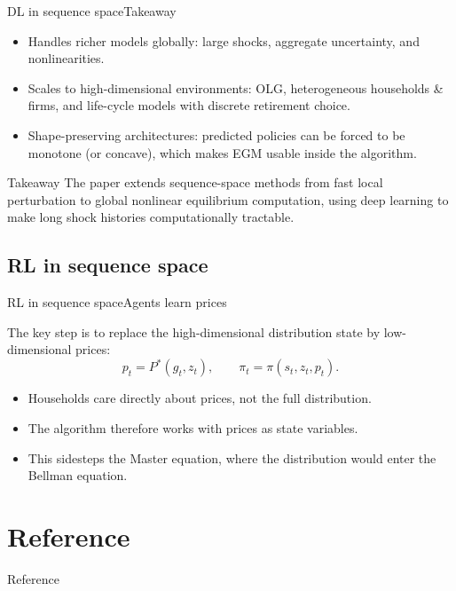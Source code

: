 \documentclass[aspectratio=169]{beamer}
\begin{document}
\begin{frame}{DL in sequence space}{Takeaway \cite{azinovic2025deep}}
\small

\begin{itemize}
    \item \alert{Handles richer models globally}: large shocks, aggregate uncertainty, and nonlinearities.
    \item \alert{Scales to high-dimensional environments}: OLG, heterogeneous households \& firms,
    and life-cycle models with discrete retirement choice.
    \item \alert{Shape-preserving architectures}: predicted policies can be forced to be monotone
    (or concave), which makes EGM usable inside the algorithm.
\end{itemize}

\begin{alertblock}{Takeaway}
The paper extends sequence-space methods from \alert{fast local perturbation} to
\alert{global nonlinear equilibrium computation}, using deep learning to make long shock histories
computationally tractable.
\end{alertblock}

\end{frame}

\subsection{RL in sequence space}

\begin{frame}{RL in sequence space}{Agents learn prices \cite{yang2025structural}}
\small

The key step is to replace the high-dimensional distribution state by low-dimensional prices:
\[
p_t = P^*(g_t,z_t),
\qquad
\pi_t = \pi(s_t,z_t,p_t).
\]

\begin{itemize}
    \item Households care directly about \alert{prices}, not the full distribution.
    \item The algorithm therefore works with \alert{prices as state variables}.
    \item This sidesteps the \alert{Master equation}, where the distribution would enter the Bellman equation.
\end{itemize}

\end{frame}




\section{Reference}

\begin{frame}[allowframebreaks]{Reference}
    \nocite{*}
    \scriptsize
    

    
\end{frame}
\end{document}
